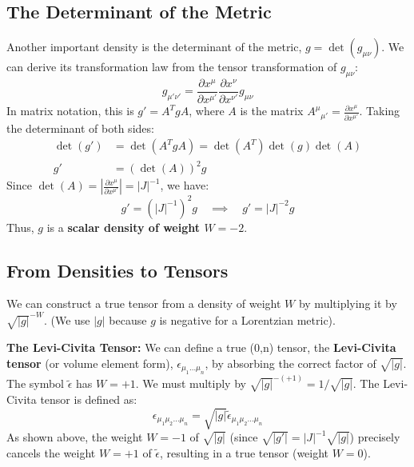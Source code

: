 \documentclass[11pt, a4paper]{report}
\begin{document}
\subsection*{The Determinant of the Metric}
Another important density is the determinant of the metric, $g = \det(g_{\mu\nu})$. We can derive its transformation law from the tensor transformation of $g_{\mu\nu}$:
\[
    g_{\mu'\nu'} = \frac{\partial x^\mu}{\partial x^{\mu'}} \frac{\partial x^\nu}{\partial x^{\nu'}} g_{\mu\nu}
\]
In matrix notation, this is $g' = A^T g A$, where $A$ is the matrix $A^\mu{}_{\mu'} = \frac{\partial x^\mu}{\partial x^{\mu'}}$.
Taking the determinant of both sides:
\begin{align*}
    \det(g') &= \det(A^T g A) = \det(A^T) \det(g) \det(A) \\
    g' &= (\det(A))^2 g
\end{align*}
Since $\det(A) = \left|\frac{\partial x^\mu}{\partial x^{\mu'}}\right| = |J|^{-1}$, we have:
\begin{equation}
    g' = (|J|^{-1})^2 g \quad \implies \quad g' = |J|^{-2} g
\end{equation}
Thus, $g$ is a \textbf{scalar density of weight $W=-2$}.

\subsection*{From Densities to Tensors}
We can construct a true tensor from a density of weight $W$ by multiplying it by $\sqrt{|g|}^{-W}$. (We use $|g|$ because $g$ is negative for a Lorentzian metric).

\textbf{The Levi-Civita Tensor:}
We can define a true (0,n) tensor, the \textbf{Levi-Civita tensor} (or volume element form), $\epsilon_{\mu_1\dots\mu_n}$, by absorbing the correct factor of $\sqrt{|g|}$.
The symbol $\tilde{\epsilon}$ has $W=+1$. We must multiply by $\sqrt{|g|}^{-(+1)} = 1/\sqrt{|g|}$.
The Levi-Civita tensor is defined as:
\begin{equation}
    \epsilon_{\mu_1\mu_2\dots\mu_n} = \sqrt{|g|} \tilde{\epsilon}_{\mu_1\mu_2\dots\mu_n}
\end{equation}
As shown above, the weight $W=-1$ of $\sqrt{|g|}$ (since $\sqrt{|g'|} = |J|^{-1}\sqrt{|g|}$) precisely cancels the weight $W=+1$ of $\tilde{\epsilon}$, resulting in a true tensor (weight $W=0$).
\end{document}
